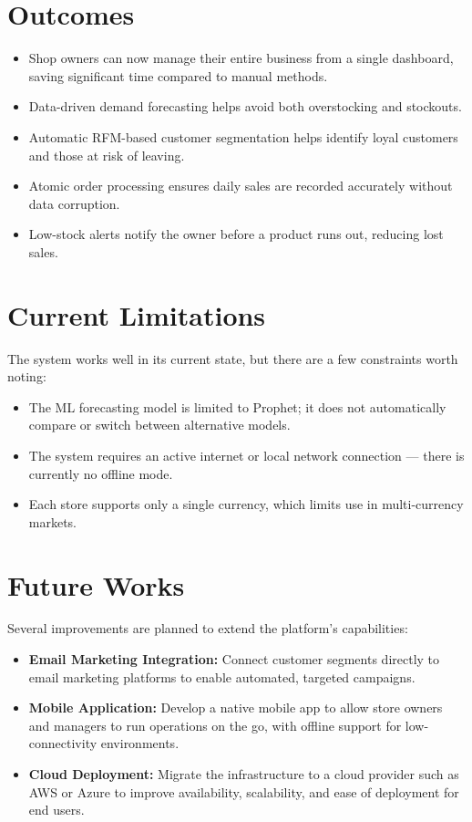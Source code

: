 \documentclass[12pt,a4paper]{report}
\begin{document}
\section{Outcomes}
\begin{itemize}
    \item Shop owners can now manage their entire business from a single dashboard, saving significant time compared to manual methods.
    \item Data-driven demand forecasting helps avoid both overstocking and stockouts.
    \item Automatic RFM-based customer segmentation helps identify loyal customers and those at risk of leaving.
    \item Atomic order processing ensures daily sales are recorded accurately without data corruption.
    \item Low-stock alerts notify the owner before a product runs out, reducing lost sales.
\end{itemize}

\section{Current Limitations}
The system works well in its current state, but there are a few constraints worth noting:
\begin{itemize}
    \item The ML forecasting model is limited to Prophet; it does not automatically compare or switch between alternative models.
    \item The system requires an active internet or local network connection — there is currently no offline mode.
    \item Each store supports only a single currency, which limits use in multi-currency markets.
\end{itemize}

\section{Future Works}
Several improvements are planned to extend the platform's capabilities:
\begin{itemize}
    \item \textbf{Email Marketing Integration:} Connect customer segments directly to email marketing platforms to enable automated, targeted campaigns.
    \item \textbf{Mobile Application:} Develop a native mobile app to allow store owners and managers to run operations on the go, with offline support for low-connectivity environments.
    \item \textbf{Cloud Deployment:} Migrate the infrastructure to a cloud provider such as AWS or Azure to improve availability, scalability, and ease of deployment for end users.
\end{itemize}
\end{document}
